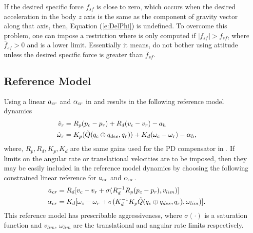 %
\begin{remark}
If the desired specific force $f_{sf}$ is close to zero, which
occurs when the desired acceleration in the body $z$ axis is the
same as the component of gravity vector along that axis, then,
Equation (\ref{e:DelPhi}) is undefined. To overcome this problem,
one can impose a restriction where  is only computed
if $| f_{sf}| > \bar{f}_{sf}$, where $\bar{f}_{sf}
> 0$ and is a lower limit. Essentially it means, do not bother
using attitude unless the desired specific force is greater than
$\bar{f}_{sf}$.
\end{remark}
%
%
\subsection{Reference Model}
\label{s:helirefmodel}
Using a linear $a_{cr}$ and $\alpha_{cr}$ in  and  results in the following reference model dynamics
\[
\begin{split}
\dot{v}_{r}      &=  R_p(p_c - p_{r}) + R_d(v_c - v_{r}) - a_{h}\\
\dot{\omega}_{r} &= K_p(\tilde{Q}(q_c\oplus q_{des},q_{r})) + K_d(\omega_c
- \omega_{r}) - \alpha_{h},
\end{split}
\]
where, $R_p,R_d,K_p,K_d$ are the same gains used for the PD
compensator in . If limits on the angular rate or
translational velocities are to be imposed, then they may be easily
included in the reference model dynamics by choosing the following constrained linear reference for $a_{cr}$ and $\alpha_{cr}$.
\begin{align}
\label{e:acrm}
a_{cr}    &= R_d[v_c - v_{r} + \sigma(R_d^{-1}R_p(p_c - p_{r}), v_{lim})]\\
\label{e:alcrm}
 \alpha_{cr}   &= K_d[\omega_c - \omega_{r} +
\sigma(K_d^{-1}K_p\tilde{Q}(q_c\oplus q_{des},q_{r}),\omega_{lim})].
\end{align}
This reference model has prescribable aggressiveness, where $\sigma(\cdot)$ is a saturation function and
$v_{lim}$, $\omega_{lim}$ are the translational and angular rate
limits respectively.

